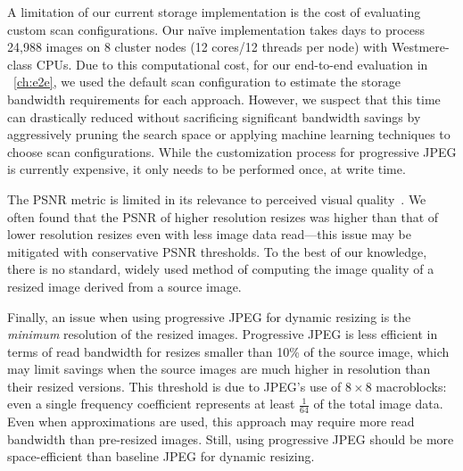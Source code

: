 A limitation of our current storage implementation is the cost of evaluating custom scan configurations.
Our na\"{i}ve implementation takes days to process 24,988 images on 8 cluster nodes (12 cores/12 threads per node) with Westmere-class CPUs. 
Due to this computational cost, for our end-to-end evaluation in ~\autoref{ch:e2e}, we used the default scan configuration to estimate the storage bandwidth requirements for each approach.
However, we suspect that this time can drastically reduced without sacrificing significant bandwidth savings by aggressively pruning the search space or applying machine learning techniques to choose scan configurations.
While the customization process for progressive JPEG is currently expensive, it only needs to be performed once, at write time. 

The PSNR metric is limited in its relevance to perceived visual quality~\cite{wang2002no}.
We often found that the PSNR of higher resolution resizes was higher than that of lower resolution resizes even with less image data read---this issue may be mitigated with conservative PSNR thresholds.
To the best of our knowledge, there is no standard, widely used method of computing the image quality of a resized image derived from a source image.

Finally, an issue when using progressive JPEG for dynamic resizing is the \emph{minimum} resolution of the resized images.
Progressive JPEG is less efficient in terms of read bandwidth for resizes smaller than 10\% of the source image, which may limit savings when the source images are much higher in resolution than their resized versions.
This threshold is due to JPEG's use of $8\times8$ macroblocks: even a single frequency coefficient represents at least $\frac{1}{64}$ of the total image data.
Even when approximations are used, this approach may require more read bandwidth than pre-resized images.
Still, using progressive JPEG should be more space-efficient than baseline JPEG for dynamic resizing.

